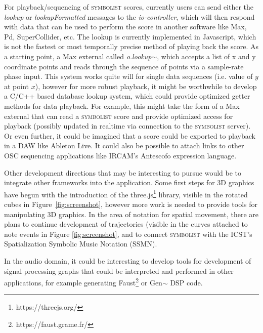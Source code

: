 \documentclass{article}
\def\symbolist{\textsc{symbolist}\xspace}
\def\iocontroller{\textit{io-controller}\xspace}
\begin{document}
For playback/sequencing of \symbolist scores, currently users can send either the \textit{lookup} or \textit{lookupFormatted} messages to the \iocontroller, which will then respond with data that can be used to perform the score in another software like Max, Pd, SuperCollider, etc.
The lookup is currently implemented in Javascript, which is not the fastest or most temporally precise method of playing back the score.
As a starting point, a Max external called \textit{o.lookup$\sim$}, which accepts a list of x and y coordinate points and reads through the sequence of points via a sample-rate phase input.
This system works quite will for single data sequences (i.e. value of $y$ at point $x$), however for more robust playback, it might be worthwhile to develop a C/C++ based database lookup system, which could provide optimized getter methods for data playback. 
For example, this might take the form of a Max external that can read a \symbolist score and provide optimized access for playback (possibly updated in realtime via connection to the \symbolist server).
Or even further, it could be imagined that a score could be exported to playback in a DAW like Ableton Live.
It could also be possible to attach links to other OSC sequencing applications like IRCAM's Antescofo expression language\cite{giavitto2017time}.

Other development directions that may be interesting to pursue would be to integrate other frameworks into the application.
Some first steps for 3D graphics have begun with the introduction of the three.js\footnote{https://threejs.org/} library, visible in the rotated cubes in Figure~\ref{fig:screenshot}, however more work is needed to provide tools for manipulating 3D graphics.
In the area of notation for spatial movement, there are plans to continue development of trajectories (visible in the curves attached to note events in Figure \ref{fig:screenshot}, and to connect \symbolist with the ICST's Spatialization Symbolic Music Notation (SSMN)\cite{ellberger2014spatialization}.

In the audio domain, it could be interesting to develop tools for development of signal processing graphs that could be interpreted and performed in other applications, for example generating Faust\footnote{https://faust.grame.fr/} or Gen$\sim$ DSP code.%
\end{document}
